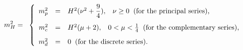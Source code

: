 \begin{equation}m_{H}^{2}=\;\;
\left \{\begin{array}{rcllr} m^2_p&=&H^2(\nu^2+{\displaystyle
\frac{9}{4}}),\;\;\;\nu\geq 0\;\;\mbox{(for the
principal series),}\vspace{0.3cm} \\
m^2_c&=&H^2(\mu+2),\;\;\;0<\mu<\frac{1}{4}\;\;\mbox{(for the
complementary series),}\vspace{0.3cm} \\
m^2_d&=&0\;\;\mbox{(for the discrete series).}
\end{array}
\right.
\end{equation}

